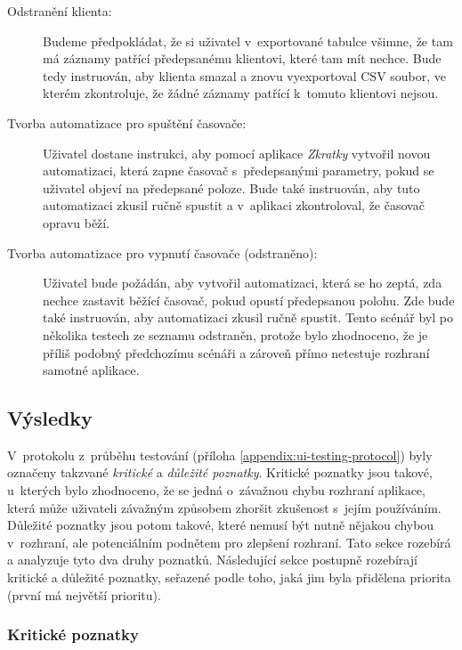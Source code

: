 \begin{description}
\item[Odstranění klienta:] Budeme předpokládat, že si uživatel v~exportované tabulce všimne, že tam má záznamy patřící předepsanému klientovi, které tam mít nechce. Bude tedy instruován, aby klienta smazal a znovu vyexportoval CSV soubor, ve kterém zkontroluje, že žádné záznamy patřící k~tomuto klientovi nejsou.
\item[Tvorba automatizace pro spuštění časovače:] Uživatel dostane instrukci, aby pomocí aplikace \emph{Zkratky} vytvořil novou automatizaci, která zapne časovač s~předepsanými parametry, pokud se uživatel objeví na předepsané poloze. Bude také instruován, aby tuto automatizaci zkusil ručně spustit a v~aplikaci zkontroloval, že časovač opravu běží.
\item[Tvorba automatizace pro vypnutí časovače (odstraněno):] Uživatel bude požádán, aby vytvořil automatizaci, která se ho zeptá, zda nechce zastavit běžící časovač, pokud opustí předepsanou polohu. Zde bude také instruován, aby automatizaci zkusil ručně spustit. Tento scénář byl po několika testech ze seznamu odstraněn, protože bylo zhodnoceno, že je příliš podobný předchozímu scénáři a zároveň přímo netestuje rozhraní samotné aplikace.
\end{description}

\subsection{Výsledky}\label{ui-testing-results}

V~protokolu z~průběhu testování (příloha \ref{appendix:ui-testing-protocol}) byly označeny takzvané \emph{kritické} a \emph{důležité poznatky}. Kritické poznatky jsou takové, u~kterých bylo zhodnoceno, že se jedná o~závažnou chybu rozhraní aplikace, která může uživateli závažným způsobem zhoršit zkušenost s~jejím používáním. Důležité poznatky jsou potom takové, které nemusí být nutně nějakou chybou v~rozhraní, ale potenciálním podnětem pro zlepšení rozhraní. Tato sekce rozebírá a analyzuje tyto dva druhy poznatků. Následující sekce postupně rozebírají kritické a důležité poznatky, seřazené podle toho, jaká jim byla přidělena priorita (první má největší prioritu).

\subsubsection{Kritické poznatky}

